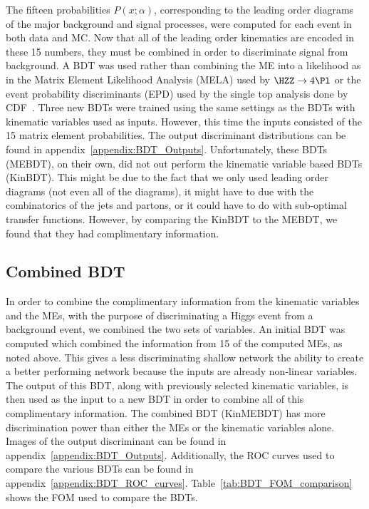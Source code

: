 The fifteen probabilities $P(x;\alpha)$, corresponding to the leading order diagrams of the major background and signal processes, were computed for each event in both data and MC.
Now that all of the leading order kinematics are encoded in these 15 numbers, they must be combined in order to discriminate signal from background.
A BDT was used rather than combining the ME into a likelihood as in the Matrix Element Likelihood Analysis (MELA) used by $\HZZ\rightarrow\text{4}\Pl$ or the event probability discriminants (EPD) used by the single top analysis done by CDF~\cite{Dong2008}.
Three new BDTs were trained using the same settings as the BDTs with kinematic variables used as inputs.
However, this time the inputs consisted of the 15 matrix element probabilities.
The output discriminant distributions can be found in appendix~\ref{appendix:BDT_Outputs}.
Unfortunately, these BDTs (MEBDT), on their own, did not out perform the kinematic variable based BDTs (KinBDT).
This might be due to the fact that we only used leading order diagrams (not even all of the diagrams), it might have to due with the combinatorics of the jets and partons, or it could have to do with sub-optimal transfer functions.
However, by comparing the KinBDT to the MEBDT, we found that they had complimentary information.

\subsection{Combined BDT}

In order to combine the complimentary information from the kinematic variables and the MEs, with the purpose of discriminating a Higgs event from a background event, we combined the two sets of variables.
An initial BDT was computed which combined the information from 15 of the computed MEs, as noted above.
This gives a less discriminating shallow network the ability to create a better performing network because the inputs are already non-linear variables.
The output of this BDT, along with previously selected kinematic variables, is then used as the input to a new BDT in order to combine all of this complimentary information.
The combined BDT (KinMEBDT) has more discrimination power than either the MEs or the kinematic variables alone.
Images of the output discriminant can be found in appendix~\ref{appendix:BDT_Outputs}.
Additionally, the ROC curves used to compare the various BDTs can be found in appendix~\ref{appendix:BDT_ROC_curves}.
Table~\ref{tab:BDT_FOM_comparison} shows the FOM used to compare the BDTs.

